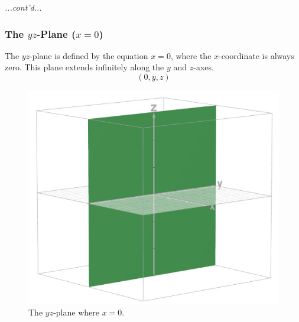 \documentclass{article}
\begin{document}
\begin{conceptbox}
    \textit{...cont'd...}
    
    \begin{blankbox}
        \subsubsection*{The \( yz \)-Plane (\( x = 0 \))}
        \begin{minipage}{0.4\textwidth}
            The \( yz \)-plane is defined by the equation \( x = 0 \), where the \( x \)-coordinate is always zero. 
            This plane extends infinitely along the \( y \) and \( z \)-axes.
            \[
                (0, y, z)
            \]
        \end{minipage}
        \begin{minipage}{0.5\textwidth}
            \begin{figure}[H]
                \centering
                \includegraphics[width=\textwidth]{yz plane.png}
                \caption{The \( yz \)-plane where \( x = 0 \).}
                \label{fig:yz_plane}
            \end{figure}
        \end{minipage}
    \end{blankbox}
    
    \begin{blankbox}

\end{blankbox}
\end{conceptbox}
\end{document}
